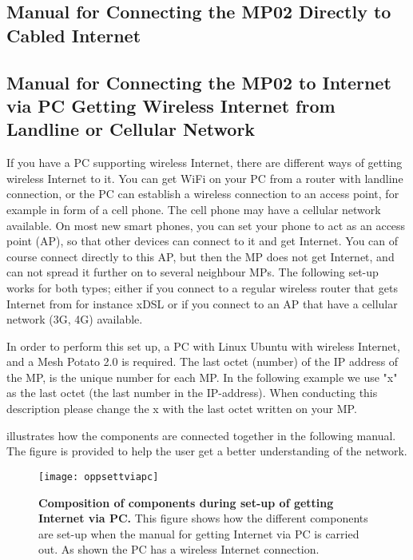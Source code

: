 \subsection{Manual for Connecting the MP02 Directly to Cabled Internet}
\label{subsec:cabledInternet}

\clearpage
\subsection{Manual for Connecting the MP02 to Internet via PC Getting Wireless Internet from Landline or Cellular Network}
\label{subsec:internetviaPC}

If you have a PC supporting wireless Internet, there are different ways of getting wireless Internet to it. You can get WiFi on your PC from a router with landline connection, or the PC can establish a wireless connection to an access point, for example in form of a cell phone. The cell phone may have a cellular network available. On most new smart phones, you can set your phone to act as an access point (AP), so that other devices can connect to it and get Internet. You can of course connect directly to this AP, but then the MP does not get Internet, and can not spread it further on to several neighbour MPs. The following set-up works for both types; either if you connect to a regular wireless router that gets Internet from for instance xDSL or if you connect to an AP that have a cellular network (3G, 4G) available. 

In order to perform this set up, a PC with Linux Ubuntu with wireless Internet, and a Mesh Potato 2.0 is required. The last octet (number) of the IP address of the MP, is the unique number for each MP. In the following example we use "x" as the last octet (the last number in the IP-address). When conducting this description please change the x with the last octet written on your MP.

 illustrates how the components are connected together in the following manual. The figure is provided to help the user get a better understanding of the network. 

\begin{figure}[h!]
  \centering
      \texttt{[image: oppsettviapc]}
  \caption [Composition of components during set-up of getting Internet via PC]{\textbf{Composition of components during set-up of getting Internet via PC.} This figure shows how the different components are set-up when the manual for getting Internet via PC is carried out. As shown the PC has a wireless Internet connection.}
  \label{fig:oppsettviapc}
\end{figure}

